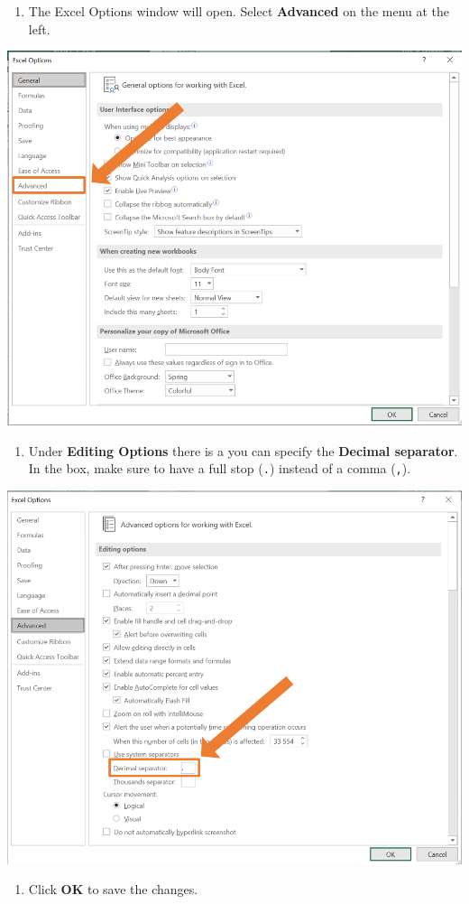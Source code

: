 \documentclass[
]{book}
\providecommand{\tightlist}{%
  \setlength{\itemsep}{0pt}\setlength{\parskip}{0pt}}
\begin{document}
\begin{enumerate}
\def\labelenumi{\arabic{enumi}.}
\setcounter{enumi}{2}
\tightlist
\item
  The Excel Options window will open. Select \textbf{Advanced} on the menu at the left.
\end{enumerate}

\begin{center}\includegraphics[width=0.5\linewidth]{Figures/Decimal_step3} \end{center}

\begin{enumerate}
\def\labelenumi{\arabic{enumi}.}
\setcounter{enumi}{3}
\tightlist
\item
  Under \textbf{Editing Options} there is a you can specify the \textbf{Decimal separator}. In the box, make sure to have a full stop (\texttt{.}) instead of a comma (\texttt{,}).
\end{enumerate}

\begin{center}\includegraphics[width=0.5\linewidth]{Figures/Decimal_step4} \end{center}

\begin{enumerate}
\def\labelenumi{\arabic{enumi}.}
\setcounter{enumi}{4}
\tightlist
\item
  Click \textbf{OK} to save the changes.
\end{enumerate}
\end{document}
